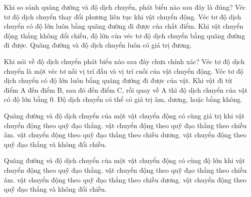 \begin{ex}
Khi so sánh quãng đường và độ dịch chuyển, phát biểu nào sau đây là đúng?
\choice
{Véc tơ độ dịch chuyển thay đổi phương liên tục khi vật chuyển động.}
{Véc tơ độ dịch chuyển có độ lớn luôn bằng quãng đường đi được của chất điểm.}
{\True Khi vật chuyển động thẳng không đổi chiều, độ lớn của véc tơ độ dịch chuyển bằng quãng đường đi được.}
{Quãng đường và độ dịch chuyển luôn có giá trị đương.}
\end{ex}

\begin{ex}
Khi nói về độ dịch chuyển phát biểu nào sau đây chưa chính xác?
\choice
{Véc tơ độ dịch chuyển là một véc tơ nối vị trí đầu và vị trí cuối của vật chuyển động.}
{\True Véc tơ độ dịch chuyển có độ lớn luôn bằng quãng đường đi được của vật.}
{Khi vật đi từ điểm A đến điểm B, sau đó đến điểm C, rồi quay về A thì độ dịch chuyển của vật có độ lớn bằng 0.}
{Độ dịch chuyển có thể có giá trị âm, dương, hoặc bằng không.}
\end{ex}

\begin{ex}
Quãng đường và độ dịch chuyển của một vật chuyển động có cùng giá trị khi
\choice
{vật chuyển động theo quỹ đạo thẳng.}
{vật chuyển động theo quỹ đạo thẳng theo chiều âm.}
{vật chuyển động theo quỹ đạo thẳng theo chiều dương.}
{\True vật chuyển động theo quỹ đạo thẳng và không đổi chiều.}
\end{ex}

\begin{ex}
Quãng đường và độ dịch chuyển của một vật chuyển động có cùng độ lớn khi
\choice
{vật chuyển động theo quỹ đạo thẳng.}
{vật chuyển động theo quỹ đạo thẳng theo chiều âm.}
{vật chuyển động theo quỹ đạo thẳng theo chiều dương.}
{\True vật chuyển động theo quỹ đạo thẳng và không đổi chiều.}
\end{ex}


